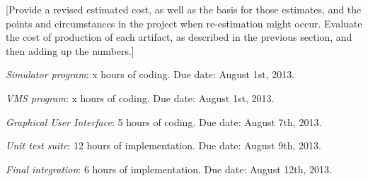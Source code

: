 \documentclass{article}
\begin{document}
[Provide a revised estimated cost, as well as the basis for those estimates, and the points and circumstances in the project when re-estimation might occur.
Evaluate the cost of production of each artifact, as described in the previous section, and then adding up the numbers.]

\vspace{0.5cm}

\emph{Simulator program}: x hours of coding. Due date: August 1st, 2013.

\emph{VMS program}: x hours of coding. Due date: August 1st, 2013.

\emph{Graphical User Interface}: 5 hours of coding. Due date: August 7th, 2013.

\emph{Unit test suite}: 12 hours of implementation. Due date: August 9th, 2013.

\emph{Final integration}: 6 hours of implementation. Due date: August 12th, 2013.
\end{document}
